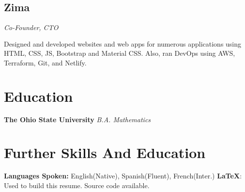 \documentclass[letterpaper,11pt]{article}
\begin{document}
\subsection{Zima}
\textit{Co-Founder, CTO}
\vspace{2mm}
\begin{adjustwidth}{1cm}{1cm}
Designed and developed websites and web
apps for numerous applications using
HTML, CSS, JS, Bootstrap and Material CSS.
Also, ran DevOps using AWS, Terraform,
Git, and Netlify.
\end{adjustwidth}
\section{Education}
\textbf{The Ohio State University}
\newline
\textit{B.A. Mathematics}

\section{Further Skills And Education}
\textbf{Languages Spoken: } English(Native), Spanish(Fluent), French(Inter.)
\newline
\textbf{\LaTeX}: Used to build this resume. Source code available.
\end{document}
